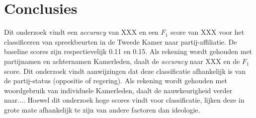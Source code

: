 \section{Conclusies}
\label{sec:conc}

Dit onderzoek vindt een \textit{accuracy} van XXX en een $F_1$ score van XXX voor het classificeren van spreekbeurten in de Tweede Kamer naar partij-affiliatie. De baseline scores zijn respectievelijk 0.11 en 0.15. Als rekening wordt gehouden met partijnamen en achternamen Kamerleden, daalt de \textit{accuracy} naar XXX en de $F_1$ score. Dit onderzoek vindt aanwijzingen dat deze classificatie afhankelijk is van de partij-status (oppositie of regering). Als rekening wordt gehouden met woordgebruik van individuele Kamerleden, daalt de nauwkeurigheid verder naar.... Hoewel dit onderzoek hoge scores vindt voor classificatie, lijken deze in grote mate afhankelijk te zijn van andere factoren dan ideologie.